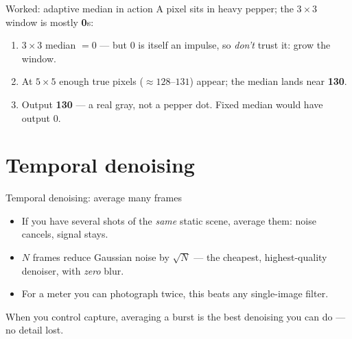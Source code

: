 \documentclass[10pt,aspectratio=169]{beamer}
\begin{document}
\begin{frame}{Worked: adaptive median in action}
  A pixel sits in heavy pepper; the $3\times3$ window is mostly \textbf{0}s:
  \begin{center}\end{center}
  \begin{enumerate}
    \item $3\times3$ median $= 0$ — but 0 is itself an impulse, so \emph{don't} trust it: grow the window.
    \item At $5\times5$ enough true pixels ($\approx128\text{--}131$) appear; the median lands near \textbf{130}.
    \item Output \textbf{130} — a real gray, not a pepper dot. Fixed median would have output 0.
  \end{enumerate}
\end{frame}

\section{Temporal denoising}

\begin{frame}{Temporal denoising: average many frames}
  \begin{itemize}
    \item If you have several shots of the \emph{same} static scene, average them: noise cancels, signal stays.
    \item $N$ frames reduce Gaussian noise by $\sqrt{N}$ — the cheapest, highest-quality denoiser, with \emph{zero} blur.
    \item For a meter you can photograph twice, this beats any single-image filter.
  \end{itemize}
  \begin{goodbox}
    When you control capture, averaging a burst is the best denoising you can do — no detail lost.
  \end{goodbox}
\end{frame}
\end{document}
